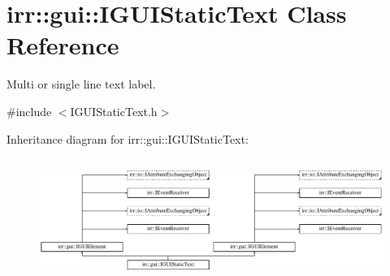 \hypertarget{classirr_1_1gui_1_1IGUIStaticText}{}\section{irr\+:\+:gui\+:\+:I\+G\+U\+I\+Static\+Text Class Reference}
\label{classirr_1_1gui_1_1IGUIStaticText}


Multi or single line text label.  




{\ttfamily \#include $<$I\+G\+U\+I\+Static\+Text.\+h$>$}

Inheritance diagram for irr\+:\+:gui\+:\+:I\+G\+U\+I\+Static\+Text\+:\begin{figure}[H]
\begin{center}
\leavevmode
\includegraphics[height=4.038462cm]{classirr_1_1gui_1_1IGUIStaticText}
\end{center}
\end{figure}
